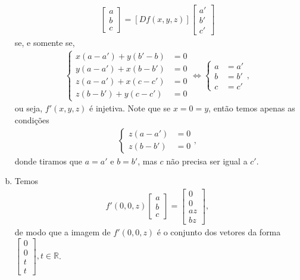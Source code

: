 \documentclass[12pt,a4paper]{article}
\newcommand{\R}{\mathbb{R}}
\begin{document}
\begin{enumerate}[a)]
\begin{align*}
            [Df(x,y,z)]\begin{bmatrix} a \\ b \\ c \end{bmatrix} 
            = [Df(x,y,z)]\begin{bmatrix} a' \\ b' \\ c' \end{bmatrix}
        \end{align*}
        se, e somente se,
        \begin{align*}
            \begin{cases}
                x(a-a') + y(b'-b) &= 0 \\
                y(a-a') + x(b-b') &= 0 \\
                z(a-a') + x(c-c') &= 0 \\
                z(b-b') + y(c-c') &= 0
            \end{cases}
            \iff 
            \begin{cases}
                a &= a' \\
                b &= b' \\
                c &= c'
            \end{cases},
        \end{align*}
        ou seja, $f'(x,y,z)$ é injetiva. Note que se $x=0=y$, então temos apenas as condições
        \begin{align*}
            \begin{cases}
                z(a-a') &= 0 \\
                z(b-b') &= 0
            \end{cases},
        \end{align*}
        donde tiramos que $a = a'$ e $b = b'$, mas $c$ não precisa ser igual a $c'$.
        \item Temos
        \begin{align*}
            f'(0,0,z)\begin{bmatrix} a \\ b \\ c \end{bmatrix} = \begin{bmatrix} 0 \\ 0 \\ az \\ bz \end{bmatrix},
        \end{align*}
        de modo que a imagem de $f'(0,0,z)$ é o conjunto dos vetores da forma 
        $\displaystyle{ \begin{bmatrix} 0 \\ 0 \\ t \\ t \end{bmatrix}, t\in\R }$.
    \end{enumerate}
%
\end{document}
